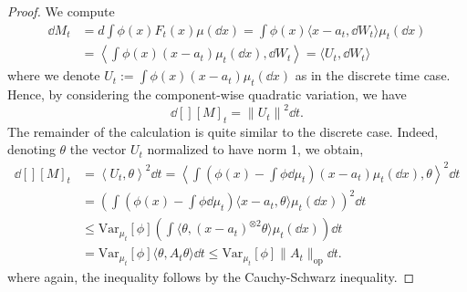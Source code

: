 

\begin{proof}
  We compute
  \begin{align*}
    \dd M_t & = d \int \phi(x) F_t(x) \mu(\dd x) = \int \phi(x) \langle x - a_t, \dd W_t \rangle \mu_t(\dd x)\\
    & = \left\langle \int \phi(x)(x - a_t)\mu_t(\dd x), \dd W_t\right\rangle = \langle U_t, \dd W_t\rangle
  \end{align*}
  where we denote \(U_t := \int \phi(x)(x - a_t)\mu_t(\dd x)\) as in the discrete time case.
  Hence, by considering the component-wise quadratic variation, we have
  \begin{equation}\label{eq:diff_qvar}
    \dd[] [M]_t = \left\| U_t \right\|^2 \dd t.
  \end{equation}
  The remainder of the calculation is quite similar to the discrete case. Indeed, denoting \(\theta\) the vector 
  \(U_t\) normalized to have norm 1, we obtain,
  \begin{equation}\label{eq:red_a}
    \begin{split}
      \dd[] [M]_t & = \left\langle U_t, \theta \right\rangle^2 \dd t
        = \left\langle \int \left(\phi(x) - \int \phi \dd \mu_t\right)(x - a_t)\mu_t(\dd x), \theta\right\rangle^2 \dd t\\
      & = \left(\int \left(\phi(x) - \int \phi \dd \mu_t\right) \langle x - a_t, \theta\rangle \mu_t(\dd x)\right)^2 \dd t\\
      & \le \text{Var}_{\mu_t}[\phi] \left(\int \langle\theta, (x - a_t)^{\otimes 2} \theta\rangle \mu_t(\dd x)\right) \dd t\\
      & = \text{Var}_{\mu_t}[\phi] \langle\theta, A_t \theta\rangle\dd t \le \text{Var}_{\mu_t}[\phi] \|A_t\|_{\text{op}} \dd t.
    \end{split}
  \end{equation}
  where again, the inequality follows by the Cauchy-Schwarz inequality.
\end{proof}

